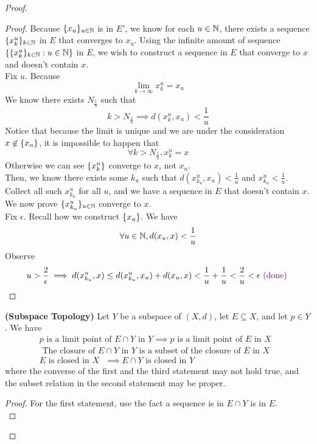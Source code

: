 \documentclass{report}
\begin{document}
\begin{proof}
\begin{proof}
Because $\{ x_u \}_{u\in\mathbb{N}}$ is in $E'$, we know for each  $u\in\mathbb{N}$, there exists a sequence  $\{ x^u_k \}_{k\in\mathbb{N}}$ in $E$ that converges to $x_u$. Using the infinite amount of sequence $\{ \{ x^u_k \}_{k\in\mathbb{N}}:u\in\mathbb{N} \}$ in $E$, we wish to construct a sequence in $E$ that converge to  $x$ and doesn't contain  $x$.\\

Fix $u$. Because 
\begin{equation}
\lim_{k\to\infty} x_k^u=x_u
\end{equation}
We know there exists $N_{\frac{1}{u}}$ such that
\begin{equation}
k>N_{\frac{1}{u}}\implies d(x_k^u,x_u)<\frac{1}{u}
\end{equation}
Notice that because the limit is unique and we are under the consideration $x\not\in \{ x_n \}$, it is impossible to happen that 
\begin{equation}
\forall k>N_{\frac{1}{u}}, x_k^u=x
\end{equation}
Otherwise we can see $\{ x^n_k \}$ converge to $x$, not  $x_n$.\\

Then, we know there exists some  $k_u$ such that  $d(x_{k_u}^u,x_u)<\frac{1}{u}$ and $x_{k_u}^u<\frac{1}{u}$. Collect all such $x^u_{k_u}$ for all $u$, and we have a sequence in  $E$ that doesn't contain $x$. We now prove $\{ x^u_{k_u} \}_{u\in\mathbb{N}}$ converge to $x$.\\

Fix $\epsilon $. Recall how we construct $\{ x_u \}$. We have
\begin{equation}
\forall u\in\mathbb{N}, d(x_u,x)<\frac{1}{u}
\end{equation}
Observe  
\begin{equation}
u>\frac{2}{\epsilon }\implies d(x^u_{k_u},x)\leq d(x^u_{k_u},x_u)+d(x_u,x)<\frac{1}{u}+\frac{1}{u}<\frac{2}{u}<\epsilon \textcolor{violet}{\text{ (done) }}
\end{equation}
\end{proof}
\begin{theorem}
\label{1.2.11}
\textbf{(Subspace Topology)} Let $Y$ be a subspace of  $(X,d)$, let $E\subseteq X$, and let $p\in Y$. We have
\begin{gather}
p\text{ is a limit point of $E\cap Y$ in }Y\implies p\text{ is a limit point of $E$ in  $X$ }\\
\text{ The closure of $E\cap Y$  in $Y$ is a subset of the closure of $E$ in $X$ }\\
E\text{ is closed in $X$ }\implies  E\cap Y\text{ is closed in $Y$ }
\end{gather}
where the converse of the first and the third statement may not hold true, and the subset relation in the second statement may be proper. 
\end{theorem}
\begin{proof}
For the first statement, use the fact a sequence is in $E\cap Y$ is in $E$.\\


\end{proof}
\end{proof}
\end{document}
